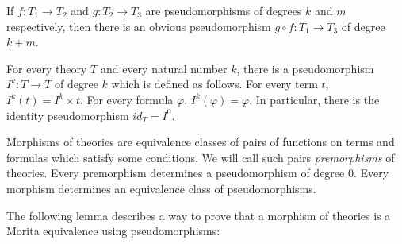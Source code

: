 \documentclass[reqno]{amsart}
\theoremstyle{definition}
\theoremstyle{remark}
\numberwithin{figure}{section}
\begin{document}
\begin{example}
If $f : T_1 \to T_2$ and $g : T_2 \to T_3$ are pseudomorphisms of degrees $k$ and $m$ respectively, then there is an obvious pseudomorphism $g \circ f : T_1 \to T_3$ of degree $k+m$.
\end{example}

\begin{example}
For every theory $T$ and every natural number $k$, there is a pseudomorphism $I^k : T \to T$ of degree $k$ which is defined as follows.
For every term $t$, $I^k(t) = I^k \times t$.
For every formula $\varphi$, $I^k(\varphi) = \varphi$.
In particular, there is the identity pseudomorphism $id_T = I^0$.
\end{example}

\begin{example}
Morphisms of theories are equivalence classes of pairs of functions on terms and formulas which satisfy some conditions.
We will call such pairs \emph{premorphisms} of theories.
Every premorphism determines a pseudomorphism of degree 0.
Every morphism determines an equivalence class of pseudomorphisms.
\end{example}

The following lemma describes a way to prove that a morphism of theories is a Morita equivalence using pseudomorphisms:
\end{document}
